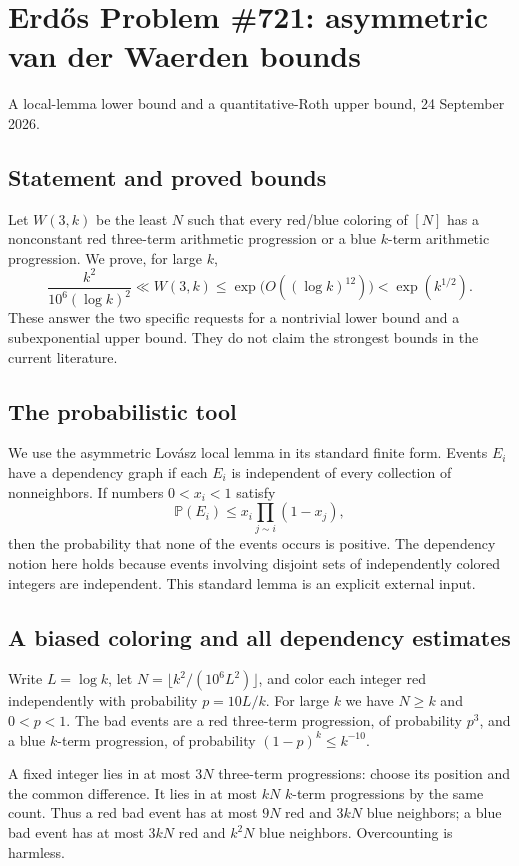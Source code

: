 \section{Erd\H{o}s Problem \#721: asymmetric van der Waerden bounds}
\noindent A local-lemma lower bound and a quantitative-Roth upper bound, 24 September 2026.

\subsection*{Statement and proved bounds}
Let $W(3,k)$ be the least $N$ such that every red/blue coloring of $[N]$ has a nonconstant red three-term arithmetic progression or a blue $k$-term arithmetic progression. We prove, for large $k$,
\[
 \frac{k^2}{10^6(\log k)^2}\ll W(3,k)
 \leq \exp\bigl(O((\log k)^{12})\bigr)<\exp(k^{1/2}).
\]
These answer the two specific requests for a nontrivial lower bound and a subexponential upper bound. They do not claim the strongest bounds in the current literature.

\subsection*{The probabilistic tool}
We use the asymmetric Lov\'asz local lemma in its standard finite form. Events $E_i$ have a dependency graph if each $E_i$ is independent of every collection of nonneighbors. If numbers $0<x_i<1$ satisfy
\[
 \mathbb P(E_i)\leq x_i\prod_{j\sim i}(1-x_j),
\]
then the probability that none of the events occurs is positive. The dependency notion here holds because events involving disjoint sets of independently colored integers are independent. This standard lemma is an explicit external input.

\subsection*{A biased coloring and all dependency estimates}
Write $L=\log k$, let $N=\lfloor k^2/(10^6L^2)\rfloor$, and color each integer red independently with probability $p=10L/k$. For large $k$ we have $N\geq k$ and $0<p<1$.
The bad events are a red three-term progression, of probability $p^3$, and a blue $k$-term progression, of probability $(1-p)^k\leq k^{-10}$.

A fixed integer lies in at most $3N$ three-term progressions: choose its position and the common difference. It lies in at most $kN$ $k$-term progressions by the same count. Thus a red bad event has at most $9N$ red and $3kN$ blue neighbors; a blue bad event has at most $3kN$ red and $k^2N$ blue neighbors. Overcounting is harmless.

